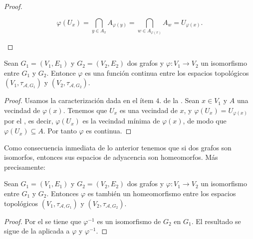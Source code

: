 \begin{proof}
\begin{itemize}
         $$
         \varphi(U_x)=\bigcap_{y\in A_x}A_{\varphi(y)}=\bigcap_{w\in A_{\varphi(x)}}A_w=U_{\varphi(x)}.
         $$
   \end{itemize}
\end{proof}
\begin{Prop}\label{Prop:Isomorfismo_continua}
   Sean $G_1=(V_1,E_1)$ y $G_2=(V_2,E_2)$ dos grafos y $\varphi:V_1\to V_2$ un isomorfismo entre $G_1$ y $G_2$. Entonce $\varphi$ es una función continua entre los espacios topológicos $(V_1,\tau_{\mathcal{A},G_1})$ y $(V_2, \tau_{\mathcal{A},G_2})$.
\end{Prop}
\begin{proof}
   Usamos la caracterización dada en el ítem $4.$ de la . Sean $x\in V_1$ y $A$ una vecindad de $\varphi(x)$. Tenemos que $U_x$ es una vecindad de $x$, y $\varphi(U_x)=U_{\varphi(x)}$ por el , es decir, $\varphi(U_x)$ es la vecindad mínima de $\varphi(x)$, de modo que $\varphi(U_x)\subseteq A$. Por tanto $\varphi$ es continua.
\end{proof}
Como consecuencia inmediata de lo anterior tenemos que si dos grafos son isomorfos, entonces sus espacios de adyacencia son homeomorfos. Más precisamente:
\begin{Cor}
   Sean $G_1=(V_1,E_1)$ y $G_2=(V_2,E_2)$ dos grafos y $\varphi:V_1\to V_2$ un isomorfismo entre $G_1$ y $G_2$. Entonces $\varphi$ es también un homeomorfismo entre los espacios topológicos $(V_1,\tau_{\mathcal{A},G_1})$ y $(V_2,\tau_{\mathcal{A},G_2})$. 
\end{Cor}
\begin{proof}
   Por el  se tiene que $\varphi^{-1}$ es un isomorfismo de $G_2$ en $G_1$. El resultado se sigue de la  aplicada a $\varphi$ y $\varphi^{-1}$.
\end{proof}
